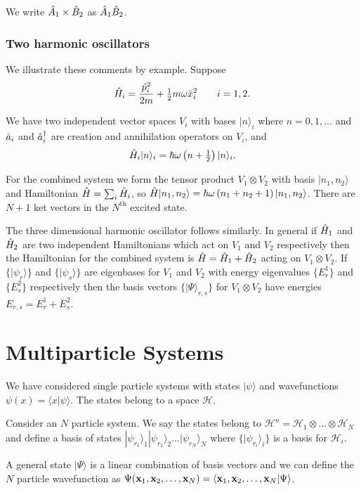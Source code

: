 \documentclass{notes}
\newcommand{\cH}{\mathcal{H}}
\newcommand{\ket}[1]{|#1\rangle}
\newcommand{\scp}[2]{\langle#1|#2\rangle}
\begin{document}
We write $\Hat{A}_1 \times \Hat{B}_2$ as $\Hat{A}_1 \Hat{B}_2$.

\subsubsection*{Two harmonic oscillators}

We illustrate these comments by example.  Suppose
\[
\Hat{H}_i = \frac{\Hat{p}_i^2}{2 m} + \tfrac{1}{2} m \omega \Hat{x}_i^2
\qquad i=1,2.
\]

We have two independent vector spaces $V_i$ with bases $\ket{n}_i$
where $n=0,1,\dots$ and $\Hat{a}_i$ and $\Hat{a}_i^\dag$ are
creation and annihilation operators on $V_i$, and
\[
\Hat{H}_i \ket{n}_i = \hbar \omega \left( n + \tfrac{1}{2} \right) \ket{n}_i.
\]

For the combined system we form the tensor product $V_1 \otimes V_2$
with basis $\ket{n_1,n_2}$ and Hamiltonian $\Hat{H} = \sum_i \Hat{H}_i$,
so $\Hat{H} \ket{n_1,n_2} = \hbar \omega \left( n_1 + n_2 + 1 \right)
\ket{n_1,n_2}$.  There are $N+1$ ket vectors in the $N^{\text{th}}$ excited
state.

The three dimensional harmonic oscillator follows similarly.  In general
if $\Hat{H}_1$ and $\Hat{H}_2$ are two independent Hamiltonians which
act on $V_1$ and $V_2$ respectively then the Hamiltonian for the
combined system is $\Hat{H} = \Hat{H}_1 + \Hat{H}_2$ acting
on $V_1 \otimes V_2$.  If $\{ \ket{\psi_r} \}$ and
$\{ \ket{\psi_s} \}$ are eigenbases for $V_1$ and $V_2$ with energy
eigenvalues $\{E^1_r\}$ and $\{E^2_s\}$ respectively then the basis
vectors $\{ \ket{\Psi}_{r,s}\}$ for $V_1 \otimes V_2$ have energies
$E_{r,s} = E^1_r + E^2_s$.

\section{Multiparticle Systems}

We have considered single particle systems with states $\ket{\psi}$
and wavefunctions $\psi(x) = \scp{x}{\psi}$.  The states belong to a
space $\cH$.

Consider an $N$ particle system.  We say the states belong to
$\cH^n = \cH_1 \otimes \dots \otimes \cH_N$ and define a basis of states
$\ket{\psi_{r_1}}_1 \ket{\psi_{r_2}}_2 \dots \ket{\psi_{r_N}}_N$ where
$\{ \ket{\psi_{r_i}}_i \}$ is a basis for $\cH_i$.

A general state $\ket{\Psi}$ is a linear combination of basis vectors and
we can define the $N$ particle wavefunction as
$\Psi(\vect{x}_1, \vect{x}_2, \dots, \vect{x}_N)
= \scp{\vect{x}_1, \vect{x}_2, \dots, \vect{x}_N}{\Psi}$.
\end{document}
